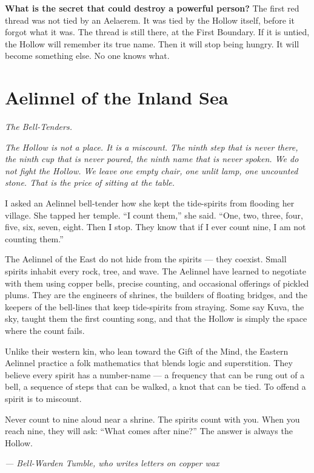 \begin{almanac}
\textbf{What is the secret that could destroy a powerful person?} The first red thread was not tied by an Aelaerem. It was tied by the Hollow itself, before it forgot what it was. The thread is still there, at the First Boundary. If it is untied, the Hollow will remember its true name. Then it will stop being hungry. It will become something else. No one knows what.
\end{almanac}

\newpage

\newpage

\chapter{Aelinnel of the Inland Sea}
\label{chap:aelinnel}

\emph{The Bell-Tenders.}

\noindent
{\Large
\textit{The Hollow is not a place. It is a miscount. The ninth step that is never there, the ninth cup that is never poured, the ninth name that is never spoken. We do not fight the Hollow. We leave one empty chair, one unlit lamp, one uncounted stone. That is the price of sitting at the table.}

\vspace{0.5em}

I asked an Aelinnel bell-tender how she kept the tide-spirits from flooding her village. She tapped her temple. ``I count them,'' she said. ``One, two, three, four, five, six, seven, eight. Then I stop. They know that if I ever count nine, I am not counting them.''

\vspace{0.5em}

The Aelinnel of the East do not hide from the spirits --- they coexist. Small spirits inhabit every rock, tree, and wave. The Aelinnel have learned to negotiate with them using copper bells, precise counting, and occasional offerings of pickled plums. They are the engineers of shrines, the builders of floating bridges, and the keepers of the bell-lines that keep tide-spirits from straying. Some say Kuva, the sky, taught them the first counting song, and that the Hollow is simply the space where the count fails.

Unlike their western kin, who lean toward the Gift of the Mind, the Eastern Aelinnel practice a folk mathematics that blends logic and superstition. They believe every spirit has a number-name --- a frequency that can be rung out of a bell, a sequence of steps that can be walked, a knot that can be tied. To offend a spirit is to miscount.

\vspace{0.5em}

Never count to nine aloud near a shrine. The spirits count with you. When you reach nine, they will ask: ``What comes after nine?'' The answer is always the Hollow.

\vspace{1em}

\noindent\textit{--- Bell-Warden Tumble, who writes letters on copper wax}
}

